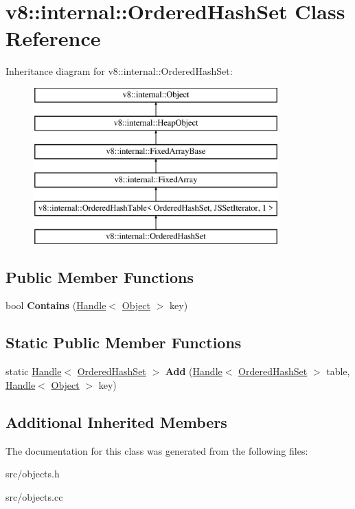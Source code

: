 \hypertarget{classv8_1_1internal_1_1_ordered_hash_set}{}\section{v8\+:\+:internal\+:\+:Ordered\+Hash\+Set Class Reference}
\label{classv8_1_1internal_1_1_ordered_hash_set}
Inheritance diagram for v8\+:\+:internal\+:\+:Ordered\+Hash\+Set\+:\begin{figure}[H]
\begin{center}
\leavevmode
\includegraphics[height=6.000000cm]{classv8_1_1internal_1_1_ordered_hash_set}
\end{center}
\end{figure}
\subsection*{Public Member Functions}
\begin{DoxyCompactItemize}
\item 
\hypertarget{classv8_1_1internal_1_1_ordered_hash_set_a95c7c0a0d9d4c3e900b2282c6b739d80}{}bool {\bfseries Contains} (\hyperlink{classv8_1_1internal_1_1_handle}{Handle}$<$ \hyperlink{classv8_1_1internal_1_1_object}{Object} $>$ key)\label{classv8_1_1internal_1_1_ordered_hash_set_a95c7c0a0d9d4c3e900b2282c6b739d80}

\end{DoxyCompactItemize}
\subsection*{Static Public Member Functions}
\begin{DoxyCompactItemize}
\item 
\hypertarget{classv8_1_1internal_1_1_ordered_hash_set_a9a26f71d414dec0dc2dd9c792e1bd6c7}{}static \hyperlink{classv8_1_1internal_1_1_handle}{Handle}$<$ \hyperlink{classv8_1_1internal_1_1_ordered_hash_set}{Ordered\+Hash\+Set} $>$ {\bfseries Add} (\hyperlink{classv8_1_1internal_1_1_handle}{Handle}$<$ \hyperlink{classv8_1_1internal_1_1_ordered_hash_set}{Ordered\+Hash\+Set} $>$ table, \hyperlink{classv8_1_1internal_1_1_handle}{Handle}$<$ \hyperlink{classv8_1_1internal_1_1_object}{Object} $>$ key)\label{classv8_1_1internal_1_1_ordered_hash_set_a9a26f71d414dec0dc2dd9c792e1bd6c7}

\end{DoxyCompactItemize}
\subsection*{Additional Inherited Members}


The documentation for this class was generated from the following files\+:\begin{DoxyCompactItemize}
\item 
src/objects.\+h\item 
src/objects.\+cc\end{DoxyCompactItemize}
